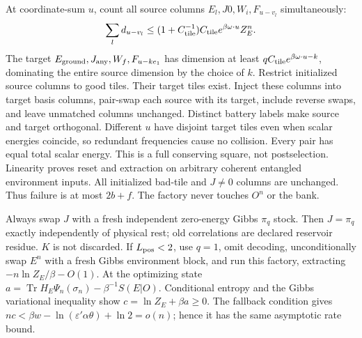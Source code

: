 \documentclass[11pt]{article}
\theoremstyle{definition}
\theoremstyle{remark}
\newcommand{\Tr}{\operatorname{Tr}}
\begin{document}
At coordinate-sum $u$, count all source columns
$E_l,J0,W_i,F_{u-v_l}$ simultaneously:
\[
 \sum_l d_{u-v_l}
 \le(1+C_{\rm tile}^{-1})C_{\rm tile}e^{\beta\omega\cdot u}Z_E^n.
\]
The target $E_{\rm ground},J_{\rm any},W_f,F_{u-ke_1}$ has dimension
at least $qC_{\rm tile}e^{\beta\omega\cdot u-k}$, dominating the
entire source dimension by the choice of $k$.
Restrict initialized source columns to good tiles. Their target
tiles exist. Inject these columns into target basis columns,
pair-swap each source with its target, include reverse swaps, and
leave unmatched columns unchanged.
Distinct battery labels make source and target orthogonal.
Different $u$ have disjoint target tiles even when scalar energies
coincide, so redundant frequencies cause no collision.
Every pair has equal total scalar energy. This is a full conserving
square, not postselection. Linearity proves reset and extraction on
arbitrary coherent entangled environment inputs. All initialized
bad-tile and $J\ne0$ columns are unchanged. Thus failure is at most
$2b+f$. The factory never touches $O^n$ or the bank.

Always swap $J$ with a fresh independent zero-energy Gibbs $\pi_q$ stock.
Then $J=\pi_q$ exactly independently of physical rest; old correlations
are declared reservoir residue. $K$ is not discarded.
If $L_{\rm pos}<2$, use $q=1$, omit decoding, unconditionally swap
$E^n$ with a fresh Gibbs environment block, and run this factory,
extracting $-n\ln Z_E/\beta-O(1)$.
At the optimizing state
$a=\Tr H_E\Psi_n(\sigma_n)-\beta^{-1}S(E|O)$.
Conditional entropy and the Gibbs variational inequality show
$c=\ln Z_E+\beta a\ge0$. The fallback condition gives
$nc<\beta w-\ln(\varepsilon'\alpha\theta)+\ln2=o(n)$;
hence it has the same asymptotic rate bound.
\end{document}
